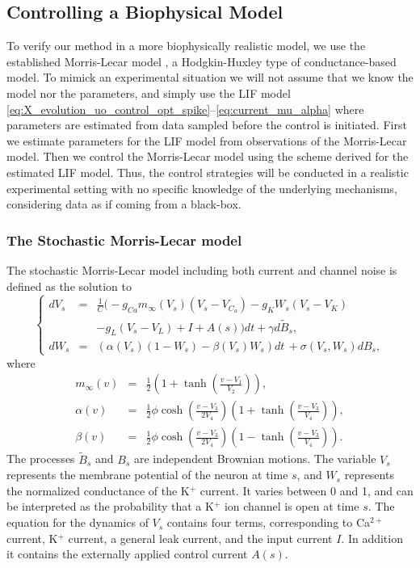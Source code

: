 \subsection{Controlling a Biophysical Model}
\label{sec:morris_lecar_control}
To verify our method in a more biophysically realistic model, we use
the established Morris-Lecar model \cite{MorrisLecar1981}, a
Hodgkin-Huxley type of conductance-based model. To mimick an
experimental situation we will not assume that we know the model nor
the parameters, and simply use the LIF model
\eqref{eq:X_evolution_uo_control_opt_spike}--\eqref{eq:current_mu_alpha} where
parameters 
are estimated from data sampled before the control is initiated. First we estimate parameters for the LIF
model from observations of the Morris-Lecar model. Then we control the Morris-Lecar
model using the scheme derived for the estimated LIF model. Thus, the
control strategies will be conducted in a realistic experimental
setting with no specific knowledge of the underlying mechanisms,
considering data as if coming from a black-box. 


\subsubsection{The Stochastic Morris-Lecar model}
\def \Vt {{ V_s }} \def \Wt {{ W_s }} \def \Vz {{ V_z}} \def \Wz {{ W_z}}

The stochastic Morris-Lecar model including both current and channel noise is
defined as the solution to
\begin{equation}
\left\{
\begin{array}{ccl}
d\Vt &=& \frac{1}{C}\Big(-g_{Ca}m_\infty(\Vt) (\Vt-V_{C_a}) - g_K\Wt(\Vt-V_K)
\\ && 
-g_L(\Vt-V_L)+I + A(s) \Big)dt +\gamma d\tilde{B}_s,\\
d\Wt&=&\left(\alpha(\Vt)(1-\Wt) - \beta(\Vt)\Wt\right) dt  \, + \sigma(\Vt,\Wt)dB_s,
\end{array}
\right.
\label{eq:ML}
\end{equation}
where 
\begin{eqnarray*}
m_\infty(v)&=&\frac{1}{2}\left(1+\tanh\left(\frac{v-V_1}{V_2}\right)\right),\\
\alpha(v) &=& \frac{1}{2}\phi \cosh\left(\frac{v-V_3}{2V_4}\right)\left(1+\tanh\left(\frac{v-V_3}{V_4}\right)\right),\\
\beta(v) &=& \frac{1}{2}\phi \cosh\left(\frac{v-V_3}{2V_4}\right)\left(1-\tanh\left(\frac{v-V_3}{V_4}\right)\right).
\end{eqnarray*}
The processes $\tilde{B}_s$ and $B_s$ are
independent Brownian motions. The variable $\Vt$ represents the membrane
potential of the neuron at time $s$, and $\Wt$ represents the normalized
conductance of the K$^+$ current. It varies between 0 and 1, and can be
interpreted as the probability that a K$^+$ ion channel is open at
time $s$. The 
equation for the dynamics of $V_s$ contains four terms,
corresponding to Ca$^{2+}$ current, K$^+$ current, a general leak
current, and the
input current $I$. In addition it contains the externally applied control
current $A(s)$.
   
